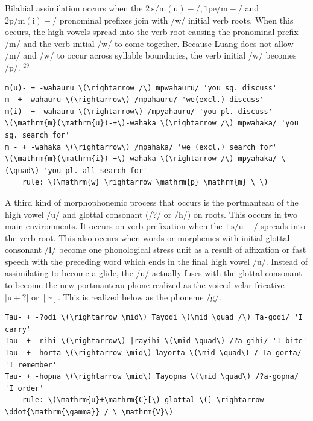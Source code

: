 \documentclass[10pt]{article}
\begin{document}
Bilabial assimilation occurs when the \(2 \mathrm{~s} / \mathrm{m}(\mathrm{u})-/, 1 \mathrm{pe} / \mathrm{m}-/\) and \(2 \mathrm{p} / \mathrm{m}(\mathrm{i})-/\) pronominal prefixes join with /w/ initial verb roots. When this occurs, the high vowels spread into the verb root causing the pronominal prefix /m/ and the verb initial /w/ to come together. Because Luang does not allow /m/ and /w/ to occur across syllable boundaries, the verb initial /w/ becomes /p/. \({ }^{29}\)

\begin{verbatim}
m(u)- + -wahauru \(\rightarrow /\) mpwahauru/ 'you sg. discuss'
m- + -wahauru \(\rightarrow\) /mpahauru/ 'we(excl.) discuss'
m(i)- + -wahauru \(\rightarrow\) /mpyahauru/ 'you pl. discuss'
\(\mathrm{m}(\mathrm{u})-+\)-wahaka \(\rightarrow /\) mpwahaka/ 'you sg. search for'
m - + -wahaka \(\rightarrow\) /mpahaka/ 'we (excl.) search for'
\(\mathrm{m}(\mathrm{i})-+\)-wahaka \(\rightarrow /\) mpyahaka/ \(\quad\) 'you pl. all search for'
    rule: \(\mathrm{w} \rightarrow \mathrm{p} \mathrm{m} \_\)
\end{verbatim}

A third kind of morphophonemic process that occurs is the portmanteau of the high vowel \(/ \mathrm{u} /\) and glottal consonant (/?/ or /h/) on roots. This occurs in two main environments. It occurs on verb prefixation when the \(1 \mathrm{~s} / \mathrm{u}-/\) spreads into the verb root. This also occurs when words or morphemes with initial glottal consonant \(/ \mathrm{I} /\) become one phonological stress unit as a result of affixation or fast speech with the preceding word which ends in the final high vowel \(/ \mathrm{u} /\). Instead of assimilating to become a glide, the /u/ actually fuses with the glottal consonant to become the new portmanteau phone realized as the voiced velar fricative \(|\mathrm{u}+\mathrm{?}|\) or \([\mathrm{\gamma}]\). This is realized below as the phoneme \(/ \mathrm{g} /\).

\begin{verbatim}
Tau- + -?odi \(\rightarrow \mid\) Tayodi \(\mid \quad /\) Ta-godi/ 'I carry'
Tau- + -rihi \(\rightarrow\) |rayihi \(\mid \quad\) /?a-gihi/ 'I bite'
Tau- + -horta \(\rightarrow \mid\) ใayorta \(\mid \quad\) / Ta-gorta/ 'I remember'
Tau- + -hopna \(\rightarrow \mid\) Tayopna \(\mid \quad\) /?a-gopna/ 'I order'
    rule: \(\mathrm{u}+\mathrm{C}[\) glottal \(] \rightarrow \ddot{\mathrm{\gamma}} / \_\mathrm{V}\)
\end{verbatim}
\end{document}
